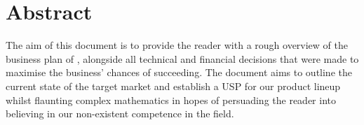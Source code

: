 \section{Abstract}
The aim of this document is to provide the reader with a rough overview of the business plan of \fw, alongside all
technical and financial decisions that were made to maximise the business' chances of succeeding.
The document aims to outline the current state of the target market and establish a USP for our product lineup
whilst flaunting complex mathematics in hopes of persuading the reader into believing in our non-existent competence
in the field.
